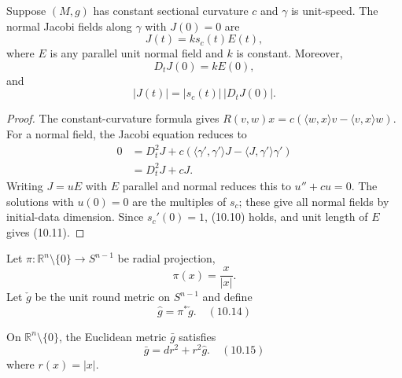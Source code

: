 \begin{proposition}
\label{prop:jacobi-constant-curvature}
Suppose $(M,g)$ has constant sectional curvature $c$ and $\gamma$ is
unit-speed.  The normal Jacobi fields along $\gamma$ with $J(0)=0$ are
\begin{equation}
J(t)=ks_c(t)E(t), \tag{10.9}
\end{equation}
where $E$ is any parallel unit normal field and $k$ is constant.  Moreover,
\begin{equation}
D_tJ(0)=kE(0), \tag{10.10}
\end{equation}
and
\begin{equation}
|J(t)|=|s_c(t)|\,|D_tJ(0)|. \tag{10.11}
\end{equation}
\end{proposition}

\begin{proof}
\sketch
The constant-curvature formula gives
$R(v,w)x=c(\langle w,x\rangle v-\langle v,x\rangle w)$.  For a normal
field, the Jacobi equation reduces to
\begin{equation}
\begin{aligned}
0&=D_t^2J+c(\langle\gamma',\gamma'\rangle J
-\langle J,\gamma'\rangle\gamma')\\
&=D_t^2J+cJ.
\end{aligned} \tag{10.12}
\end{equation}
Writing $J=uE$ with $E$ parallel and normal reduces this to
$u''+cu=0$.  The solutions with $u(0)=0$ are the multiples of $s_c$; these
give all normal fields by initial-data dimension.  Since $s_c'(0)=1$,
(10.10) holds, and unit length of $E$ gives (10.11).
\end{proof}

Let $\pi:\mathbb R^n\setminus\{0\}\to S^{n-1}$ be radial projection,
\begin{equation}
\pi(x)=\frac{x}{|x|}. \tag{10.13}
\end{equation}
Let $\check g$ be the unit round metric on $S^{n-1}$ and define
\begin{equation}
\hat g=\pi^*\check g. \quad (10.14)
\end{equation}

\begin{lemma}
\label{lem:metric-relation-euclidean}
On $\mathbb R^n\setminus\{0\}$, the Euclidean metric $\bar g$ satisfies
\begin{equation}
\bar g=dr^2+r^2\hat g. \quad (10.15)
\end{equation}
where $r(x)=|x|$.
\end{lemma}

